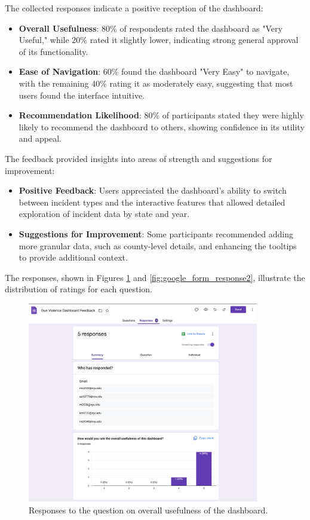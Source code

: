 \documentclass{article}
\begin{document}
The collected responses indicate a positive reception of the dashboard:

\begin{itemize}
    \item \textbf{Overall Usefulness}: 80\% of respondents rated the dashboard as "Very Useful," while 20\% rated it slightly lower, indicating strong general approval of its functionality.
    \item \textbf{Ease of Navigation}: 60\% found the dashboard "Very Easy" to navigate, with the remaining 40\% rating it as moderately easy, suggesting that most users found the interface intuitive.
    \item \textbf{Recommendation Likelihood}: 80\% of participants stated they were highly likely to recommend the dashboard to others, showing confidence in its utility and appeal.
\end{itemize}

The feedback provided insights into areas of strength and suggestions for improvement:

\begin{itemize}
    \item \textbf{Positive Feedback}: Users appreciated the dashboard’s ability to switch between incident types and the interactive features that allowed detailed exploration of incident data by state and year.
    \item \textbf{Suggestions for Improvement}: Some participants recommended adding more granular data, such as county-level details, and enhancing the tooltips to provide additional context.
\end{itemize}

The responses, shown in Figures \ref{fig:google_form_response1} and \ref{fig:google_form_response2}, illustrate the distribution of ratings for each question.

\begin{figure}[H]
    \centering
    \includegraphics[width=0.9\textwidth]{GoogleFormResponse1.png}
    \caption{Responses to the question on overall usefulness of the dashboard.}
    \label{fig:google_form_response1}
\end{figure}
\end{document}

